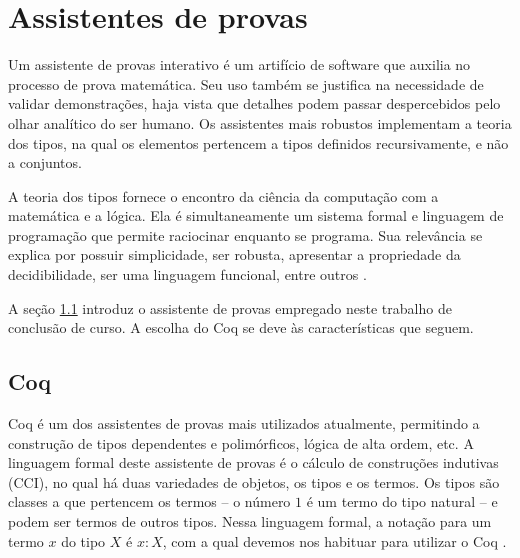 \chapter{Assistentes de provas}
\label{cap:provas}

Um assistente de provas interativo é um artifício de software que auxilia no processo de prova matemática. Seu uso também se justifica na necessidade de validar demonstrações, haja vista que detalhes podem passar despercebidos pelo olhar analítico do ser humano. Os assistentes mais robustos implementam a teoria dos tipos, na qual os elementos pertencem a tipos definidos recursivamente, e não a conjuntos.

A teoria dos tipos fornece o encontro da ciência da computação com a matemática e a lógica. Ela é simultaneamente um sistema formal e linguagem de programação que permite raciocinar enquanto se programa. Sua relevância se explica por possuir simplicidade, ser robusta, apresentar a propriedade da decidibilidade, ser uma linguagem funcional, entre outros \cite{luo}.

A seção \ref{sec:coq} introduz o assistente de provas empregado neste trabalho de conclusão de curso. A escolha do Coq se deve às características que seguem.

\section{Coq}
\label{sec:coq}

Coq é um dos assistentes de provas mais utilizados atualmente, permitindo a construção de tipos dependentes e polimórficos, lógica de alta ordem, etc. A linguagem formal deste assistente de provas é o cálculo de construções indutivas (\acs{CCI}), no qual há duas variedades de objetos, os tipos e os termos. Os tipos são classes a que pertencem os termos -- o número $1$ é um termo do tipo natural -- e podem ser termos de outros tipos. Nessa linguagem formal, a notação para um termo $x$ do tipo $X$ é $x:X$, com a qual devemos nos habituar para utilizar o Coq \cite{manualcoq}.

